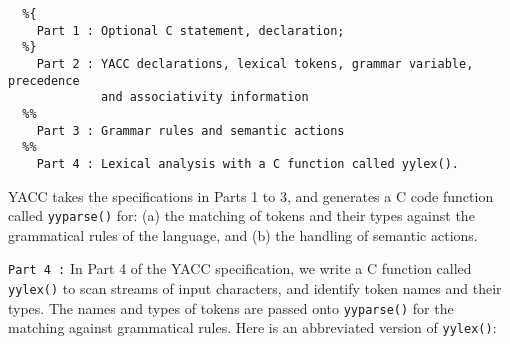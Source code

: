 \begin{footnotesize}
\begin{verbatim}
  %{
    Part 1 : Optional C statement, declaration;
  %}
    Part 2 : YACC declarations, lexical tokens, grammar variable, precedence
             and associativity information
  %%
    Part 3 : Grammar rules and semantic actions
  %%
    Part 4 : Lexical analysis with a C function called yylex().
\end{verbatim}
\end{footnotesize}

\vspace{0.15 in}\noindent
YACC takes the specifications in Parts 1 to 3, and generates a C code
function called {\tt yyparse()} for:
(a) the matching of tokens and their types
against the grammatical rules of the language, and
(b) the handling of semantic actions.

\vspace{0.15 in}\noindent
{\tt Part 4 :} In Part 4 of the YACC specification,
we write a C function called {\tt yylex()} to scan streams of input characters,
and identify token names and their types.
The names and types of tokens are passed onto {\tt yyparse()} for the
matching against grammatical rules. Here is an abbreviated version of {\tt yylex()}:

